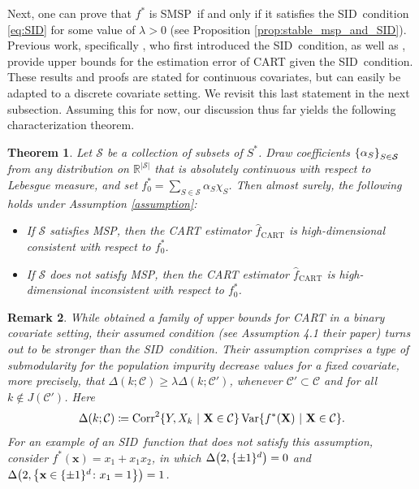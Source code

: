 \documentclass[11pt]{article}
\newtheorem{theorem}{Theorem}[section]
\newtheorem{remark}[theorem]{Remark}
\newcommand{\bx}{\mathbf{x}}
\newcommand{\bX}{\mathbf{X}}
\DeclarePairedDelimiter{\braces}{\lbrace}{\rbrace}
\DeclarePairedDelimiter{\paren}{(}{)}
\newcommand{\R}{\mathbb{R}}
\newcommand{\Var}{\operatorname{Var}}
\newcommand{\cell}{\mathcal{C}}
\newcommand{\binspace}{\braces{\pm 1}^\nfeats}
\newcommand{\nfeats}{d}
\newcommand{\cellfeatindices}{J}
\newcommand{\MSP}{\textsf{MSP}}
\newcommand{\SID}{\textsf{SID}}
\newcommand{\suppset}{S^*}
\newcommand{\fcart}{\hat{f}_{\operatorname{CART}}}
\newcommand{\monomial}{\chi}
\newcommand{\fcoefs}{\mathcal{S}}
\newcommand{\stabmsp}{\textsf{SMSP}}
\newcommand{\Corr}{\operatorname{Corr}}
\begin{document}
Next, one can prove that $f^*$ is \stabmsp~if and only if it satisfies the \SID~condition \eqref{eq:SID} for some value of $\lambda > 0$ (see Proposition \ref{prop:stable_msp_and_SID}).
Previous work, specifically \cite{chi2022asymptotic}, who first introduced the \SID~condition, as well as \cite{mazumder2024convergence}, provide upper bounds for the estimation error of CART given the \SID~condition.
These results and proofs are stated for continuous covariates, but can easily be adapted to a discrete covariate setting.
We revisit this last statement in the next subsection.
Assuming this for now, our discussion thus far yields the following characterization theorem.

\begin{theorem}
    Let $\fcoefs$ be a collection of subsets of $\suppset$.
    Draw coefficients $\braces*{\alpha_S}_{S \in \fcoefs}$ from any distribution on $\R^{|\fcoefs|}$ that is absolutely continuous with respect to Lebesgue measure, and set $f^*_0 = \sum_{S \in \fcoefs}\alpha_S\monomial_S$.
    Then almost surely, the following holds under Assumption \ref{assumption}:
    \begin{itemize}
        \item If $\fcoefs$ satisfies \MSP, then the CART estimator $\fcart$ is high-dimensional consistent with respect to $f_0^*$.
        \item If $\fcoefs$ does not satisfy \MSP, then the CART estimator $\fcart$ is high-dimensional inconsistent with respect to $f_0^*$.
    \end{itemize}
\end{theorem}

\begin{remark}
    While \cite{syrgkanis2020estimation} obtained a family of upper bounds for CART in a binary covariate setting, their assumed condition (see Assumption 4.1 their paper) turns out to be stronger than the \SID~condition.
    Their assumption comprises a type of submodularity for the population impurity decrease values for a \emph{fixed} covariate, more precisely, that $\Delta(k;\cell) \geq \lambda \Delta(k;\cell')$, whenever $\cell' \subset \cell$ and for all $k \notin \cellfeatindices(\cell')$.
    Here
    \begin{equation}
        \Delta(k;\cell) \coloneqq \Corr^2\braces*{Y,X_k~|~\bX \in \cell}\Var\braces*{f^*(\bX)~|~\bX \in \cell}.
    \end{equation}
    For an example of an \SID~function that does not satisfy this assumption, consider $f^*(\bx) = x_1 + x_1x_2$, in which $\Delta\paren*{2,\binspace} = 0$ and $\Delta\paren*{2, \braces*{\bx \in \binspace \colon x_1=1}} = 1$.
\end{remark}
\end{document}
